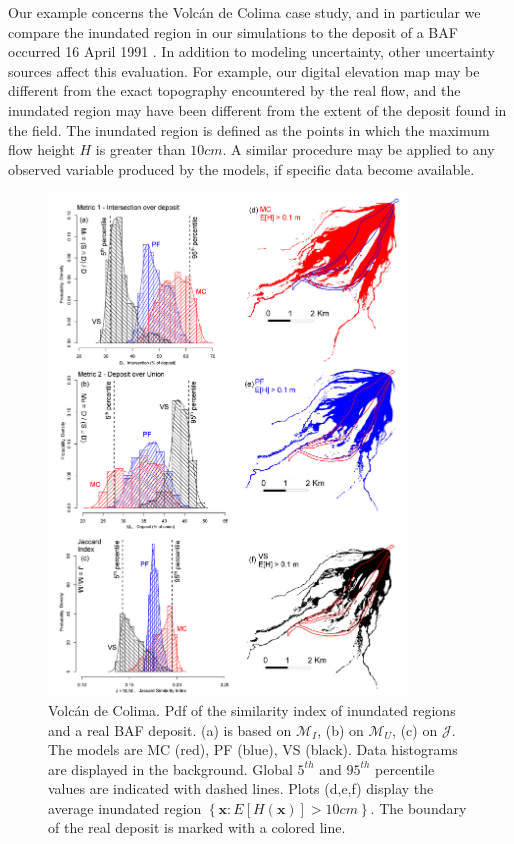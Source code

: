 \documentclass{article}
\begin{document}
Our example concerns the Volc{\'a}n de Colima case study, and in particular we compare the inundated region in our simulations to the deposit of a BAF occurred 16 April 1991 \citep{Saucedo2004, Rupp2004, Rupp2006}. In addition to modeling uncertainty, other uncertainty sources affect this evaluation. For example, our digital elevation map may be different from the exact topography encountered by the real flow, and the inundated region may have been different from the extent of the deposit found in the field. The inundated region is defined as the points in which the maximum flow height $H$ is greater than $10 cm$. A similar procedure may be applied to any observed variable produced by the models, if specific data become available.
\begin{figure}[H]
         \centering
        \includegraphics[width=0.85\textwidth]{Histograms.jpg}
        \caption{Volc{\'a}n de Colima. Pdf of the similarity index of inundated regions and a real BAF deposit. (a) is based on $\mathcal M_I$, (b) on $\mathcal M_U$, (c) on $\mathcal J$. The models are MC (red), PF (blue), VS (black). Data histograms are displayed in the background. Global $5^{th}$ and $95^{th}$ percentile values are indicated with dashed lines. Plots (d,e,f) display the average inundated region $\left\{\textbf{x} : E[H(\textbf{x})]>10 cm\right\}$. The boundary of the real deposit is marked with a colored line.}\label{fig:Colima-Hist}
\end{figure}
\end{document}
